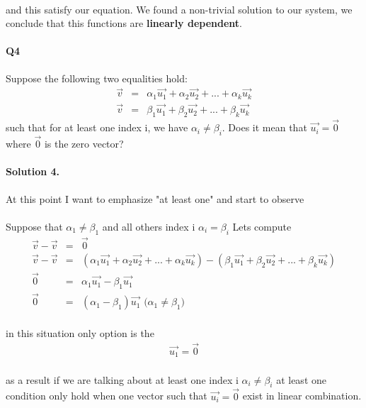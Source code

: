 \documentclass[11pt]{article}
\begin{document}
\paragraph{}and this satisfy our equation. We found a non-trivial solution to our system, we conclude that this functions are \textbf{linearly dependent}.
\paragraph{Q4}Suppose the following two equalities hold:
\begin{eqnarray*}
\vec{v} &=&\alpha_1 \vec{u_1} +\alpha_2 \vec{u_2} + ... + \alpha_k \vec{u_k}\\
\vec{v} &=&\beta_1 \vec{u_1} +\beta_2 \vec{u_2} + ... + \beta_k  \vec{u_k}
\end{eqnarray*}
such that for at least one index i, we have $\alpha_i \neq \beta_i $. Does it mean that $ \vec{u_i} = \vec{0}$ where $\vec{0}$ is the zero vector?
\paragraph{Solution 4.}At this point I want to emphasize "at least one" and start to observe
\paragraph{}Suppose that $\alpha_1 \neq \beta_1$ and all others index i $\alpha_i = \beta_i$ Lets compute
\begin{eqnarray*}
\vec{v}-\vec{v}&=&\vec{0}\\
\vec{v}-\vec{v}&=&(\alpha_1 \vec{u_1} +\alpha_2 \vec{u_2} + ... + \alpha_k \vec{u_k})-(\beta_1 \vec{u_1} +\beta_2 \vec{u_2} + ... + \beta_k  \vec{u_k})\\
\vec{0}&=&\alpha_1 \vec{u_1}-\beta_1 \vec{u_1}\\
\vec{0}&=&(\alpha_1-\beta_1)\vec{u_1} \text{               ($\alpha_1 \neq \beta_1$)}
\end{eqnarray*} 
\paragraph{}in this situation only option is the 
\begin{eqnarray*}
\vec{u_1}=\vec{0}
\end{eqnarray*}
\paragraph{}as a result if we are talking about at least one index i $\alpha_i \neq \beta_i$ at least one condition only hold when one vector such that $\vec{u_i}=\vec{0}$ exist in linear combination.
\end{document}
